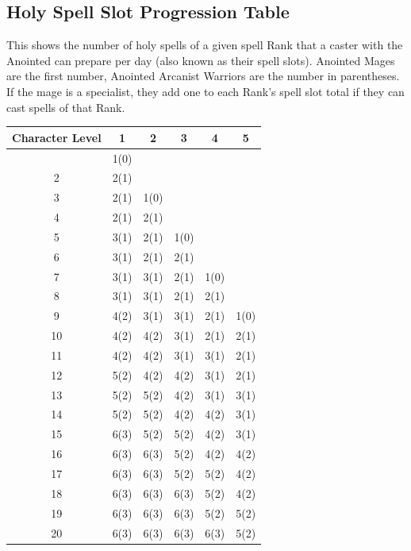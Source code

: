 \documentclass{book}
\begin{document}
\newpage

\subsection*{Holy Spell Slot Progression
	Table}\label{holy-spell-slot-progression-table}

This shows the number of holy spells of a given spell Rank that a caster
with the Anointed can prepare per day (also known as their spell slots).
Anointed Mages are the first number, Anointed Arcanist Warriors are the
number in parentheses. If the mage is a specialist, they add one to each
Rank's spell slot total if they can cast spells of that Rank.


\begin{longtable}[]{@{}cccccc@{}}
	\toprule\noalign{}
	Character Level & 1 & 2 & 3 & 4 & 5 \\
	\midrule\noalign{}
	\endhead
	\bottomrule\noalign{}
	\endlastfoot
	1 & 1(0) & & & & \\
	2 & 2(1) & & & & \\
	3 & 2(1) & 1(0) & & & \\
	4 & 2(1) & 2(1) & & & \\
	5 & 3(1) & 2(1) & 1(0) & & \\
	6 & 3(1) & 2(1) & 2(1) & & \\
	7 & 3(1) & 3(1) & 2(1) & 1(0) & \\
	8 & 3(1) & 3(1) & 2(1) & 2(1) & \\
	9 & 4(2) & 3(1) & 3(1) & 2(1) & 1(0) \\
	10 & 4(2) & 4(2) & 3(1) & 2(1) & 2(1) \\
	11 & 4(2) & 4(2) & 3(1) & 3(1) & 2(1) \\
	12 & 5(2) & 4(2) & 4(2) & 3(1) & 2(1) \\
	13 & 5(2) & 5(2) & 4(2) & 3(1) & 3(1) \\
	14 & 5(2) & 5(2) & 4(2) & 4(2) & 3(1) \\
	15 & 6(3) & 5(2) & 5(2) & 4(2) & 3(1) \\
	16 & 6(3) & 6(3) & 5(2) & 4(2) & 4(2) \\
	17 & 6(3) & 6(3) & 5(2) & 5(2) & 4(2) \\
	18 & 6(3) & 6(3) & 6(3) & 5(2) & 4(2) \\
	19 & 6(3) & 6(3) & 6(3) & 5(2) & 5(2) \\
	20 & 6(3) & 6(3) & 6(3) & 6(3) & 5(2) \\
\end{longtable}
\end{document}
